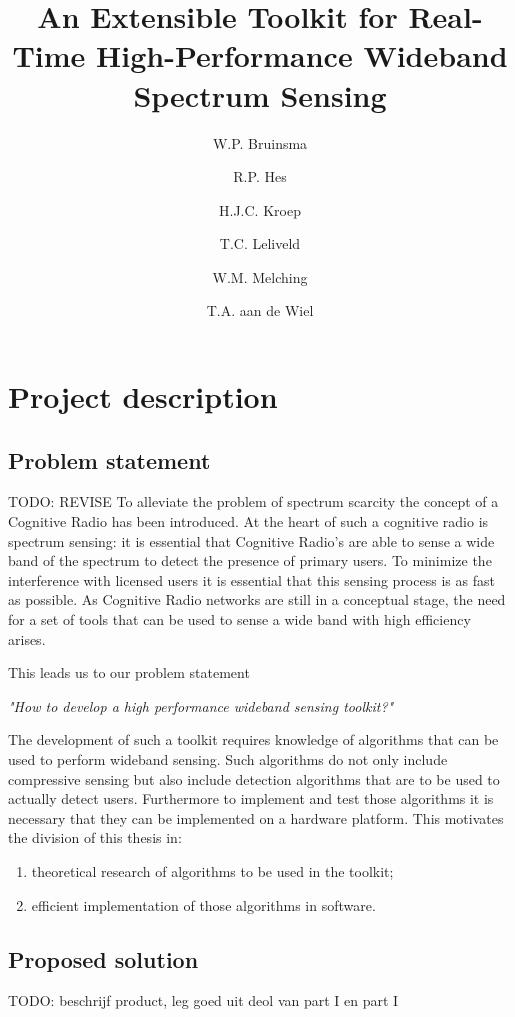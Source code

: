 \documentclass[a4paper, openany, oneside]{memoir}
\title{An Extensible Toolkit for Real-Time High-Performance Wideband Spectrum Sensing}
\author{W.P. Bruinsma \and R.P. Hes \and H.J.C. Kroep \and T.C. Leliveld \and W.M. Melching \and T.A. aan de Wiel}
\begin{document}
\chapter{Project description} \label{cha:problem_statement}
\section{Problem statement}
TODO: REVISE
To alleviate the problem of spectrum scarcity the concept of a Cognitive Radio has been introduced.
At the heart of such a cognitive radio is spectrum sensing: it is essential that Cognitive Radio's are able to sense a wide band of the spectrum to detect the presence of primary users. To minimize the interference with licensed users it is essential that this sensing process is as fast as possible. As Cognitive Radio networks are still in a conceptual stage, the need for a set of tools that can be used to sense a wide band with high efficiency arises.

This leads us to our problem statement 

\emph{"How to develop a high performance wideband sensing toolkit?"}

The development of such a toolkit requires knowledge of algorithms that can be used to perform wideband sensing. Such algorithms do not only include compressive sensing but also include detection algorithms that are to be used to actually detect users. Furthermore to implement and test those algorithms it is necessary that they can be implemented on a hardware platform. This motivates the division of this thesis in:

\begin{enumerate}
	\item theoretical research of algorithms to be used in the toolkit;
	\item efficient implementation of those algorithms in software.
\end{enumerate}

\section{Proposed solution}
TODO: beschrijf product, leg goed uit deol van part I en part I
\end{document}
